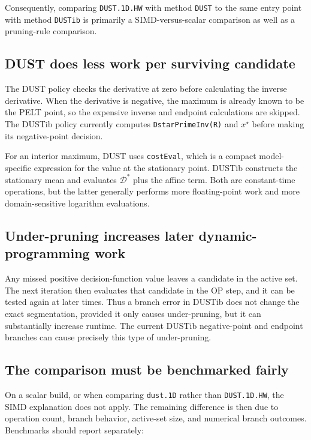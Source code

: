 \documentclass[11pt]{article}
\newcommand{\Dstar}{\mathcal{D}^*}
\begin{document}
Consequently, comparing \texttt{DUST.1D.HW} with method \texttt{DUST} to
the same entry point with method \texttt{DUSTib} is primarily a
SIMD-versus-scalar comparison as well as a pruning-rule comparison.

\subsection{DUST does less work per surviving candidate}

The DUST policy checks the derivative at zero before calculating the inverse
derivative.  When the derivative is negative, the maximum is already known to
be the PELT point, so the expensive inverse and endpoint calculations are
skipped.  The DUSTib policy currently computes
\texttt{DstarPrimeInv(R)} and $x^\star$ before making its negative-point
decision.

For an interior maximum, DUST uses \texttt{costEval}, which is a compact
model-specific expression for the value at the stationary point.  DUSTib
constructs the stationary mean and evaluates $\Dstar$ plus the affine term.
Both are constant-time operations, but the latter generally performs more
floating-point work and more domain-sensitive logarithm evaluations.

\subsection{Under-pruning increases later dynamic-programming work}

Any missed positive decision-function value leaves a candidate in the active
set.  The next iteration then evaluates that candidate in the OP step, and it
can be tested again at later times.  Thus a branch error in DUSTib does not
change the exact segmentation, provided it only causes under-pruning, but it
can substantially increase runtime.  The current DUSTib negative-point and
endpoint branches can cause precisely this type of under-pruning.

\subsection{The comparison must be benchmarked fairly}

On a scalar build, or when comparing \texttt{dust.1D} rather than
\texttt{DUST.1D.HW}, the SIMD explanation does not apply.  The remaining
difference is then due to operation count, branch behavior, active-set size,
and numerical branch outcomes.  Benchmarks should report separately:
\end{document}
